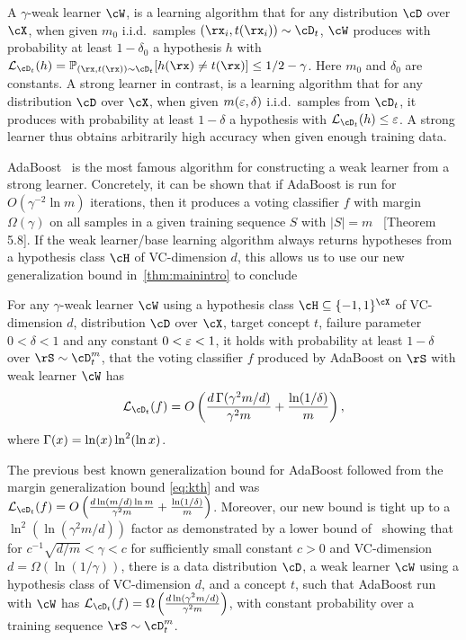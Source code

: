 A $\gamma$-weak
learner $\cW$, is a learning algorithm that for any distribution $\cD$
over $\cX$, when
given $m_0$ i.i.d.\ samples $(\rx_i,t(\rx_i)) \sim \cD_t$, $\cW$ produces with probability at least
$1-\delta_0$ a hypothesis $h$ with
$\ls_{\cD_t}(h) = \Pr_{(\rx,t(\rx)) \sim \cD_t}[h(\rx) \neq t(\rx)] \leq 1/2-\gamma$. Here $m_0$ and $\delta_0$ are
constants. A strong learner in contrast, is a learning
algorithm that for any distribution $\cD$ over $\cX$, when given $m(\varepsilon,
\delta)$ i.i.d.\ samples from $\cD_t$, it produces with probability at least
$1-\delta$ a hypothesis with $\ls_{\cD_t}(h) \leq \eps$. A strong learner
thus obtains arbitrarily high accuracy when given enough training
data.

AdaBoost~\cite{adaboostyoavfreund} is the most famous algorithm for constructing a weak
learner from a strong learner. Concretely, it can be shown that if
AdaBoost is run for $O(\gamma^{-2} \ln m)$ iterations, then it
produces a voting classifier $f$ with margin $\Omega(\gamma)$ on all
samples in a given training sequence $S$ with $|S|=m$~\cite{boostingbook} [Theorem 5.8]. If the weak
learner/base learning algorithm always returns hypotheses from a
hypothesis class $\cH$ of VC-dimension $d$, this allows us to use our
new generalization bound in~\cref{thm:mainintro} to conclude
\begin{corollary}
  \label{cor:ada}
For any $\gamma$-weak learner $\cW$ using a hypothesis class $ \cH \subseteq \{  -1,1\}^{\cX}$ of VC-dimension
$ d $, distribution $ \cD $ over $ \cX$, target
concept $t$, failure
parameter $0<\delta<1$ and any constant $ 0<\varepsilon<1 $, it holds with
probability at least $1-\delta$ over $\rS \sim \cD_t^m$, that the voting
classifier $f$ produced by AdaBoost on $\rS$ with weak learner $\cW$ has
\[
  \ls_{\cD_t}(f) = O\left(\frac{d \func(\gamma^2m/d)}{\gamma^2 m} +
  \frac{\ln(1/\delta)}{m}\right),
\]
where $\operatorname{\Gamma}(x) = \ln(x)\ln^2(\ln x)$.
\end{corollary}
The previous best known generalization bound for AdaBoost followed
from the margin generalization bound \cref{eq:kth} and was
$\ls_{\cD_t}(f) = O\left(\frac{d \ln(m/d)\ln m}{\gamma^2 m} +
  \frac{\ln(1/\delta)}{m}\right)$.
Moreover, our new bound is tight up to a $\ln^2(\ln(\gamma^2 m/d))$ factor as
demonstrated by a lower bound of~\cite{adaboostnotoptimal} showing that for
$c^{-1}\sqrt{d/m} < \gamma < c$ for sufficiently small constant $c>0$ and VC-dimension $d = \Omega(\ln(1/\gamma))$, there is a data
distribution $\cD$, a weak learner $\cW$ using a hypothesis class of
VC-dimension $d$, and  a concept $t$, such that AdaBoost run with
$\cW$ has
$\ls_{\cD_t}(f) = \Omega\left(\frac{d \ln(\gamma^2m/d)}{\gamma^2 m}\right)$,
 with constant probability over a training sequence $\rS \sim
 \cD_t^m$. 

